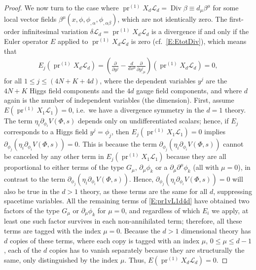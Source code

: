 \documentclass[a4paper,hidelinks, 12pt]{article}
\numberwithin{equation}{section}
\theoremstyle{plain}
\newcommand{\mc}{\mathcal}
\newcommand{\on}{\operatorname}
\begin{document}
\begin{proof}
We now turn to the case where $\on{pr}^{(1)}X_d\mc{L}_d=\on{Div} \beta \equiv d_\mu \beta^\mu$ for some local vector fields $\beta^\mu(x,\phi,\phi_{,\alpha},\phi_{,\alpha\beta})$, which are not identically zero. 
The first-order infinitesimal variation $\delta \mc{L}_d=\on{pr}^{(1)}X_d\mc{L}_d$ is a divergence if and only if the Euler operator $E$ applied to $\on{pr}^{(1)}X_d\mc{L}_d$ is zero (cf.~\eqref{E:EtotDiv}),
which means that
\begin{align}
	E_j(\on{pr}^{(1)}X_d\mc{L}_d)=(\frac{\partial}{\partial y^j}-\frac{d}{dx^\mu}\frac{\partial}{\partial y^j_{,\mu}})(\on{pr}^{(1)}X_d\mc{L}_d)=0,
\end{align}
for all $1\leq j \leq (4N+K+4d)$, where the dependent variables $y^j$
are the $4N+K$ Higgs field components and the $4d$ gauge field components, and where $d$ again is the number of independent variables (the dimension).
First, assume $E(\on{pr}^{(1)}X_1\mc{L}_1)=0$, i.e.~we have a divergence symmetry in the $d=1$ theory.
The term $\eta_i {\partial_{\phi_i} V(\Phi,s)}{}$
depends only on undifferentiated scalars; hence, 
if $E_j$ corresponds to a Higgs field $y^j=\phi_j$, then 
$E_j(\on{pr}^{(1)}X_1\mc{L}_1)=0$ implies $\partial_{\phi_j}(\eta_i \partial_{\phi_i} V(\Phi,s))=0$. This is because the term $\partial_{\phi_j}(\eta_i \partial_{\phi_i} V(\Phi,s))$ cannot be canceled by any other term in $E_j(\on{pr}^{(1)}X_1\mc{L}_1)$
because they are all proportional to either
terms of the type $G_\mu$, $\partial_\mu \phi_k$ or a $\partial_\mu\partial^\mu \phi_k$
(all with $\mu=0$), in contrast to the term $\partial_{\phi_j}(\eta_i \partial_{\phi_i} V(\Phi,s))$.  
Hence, $\partial_{\phi_j}(\eta_i \partial_{\phi_i} V(\Phi,s))=0$ will also be true in the $d>1$ theory, as these terms are the same for all $d$, suppressing spacetime variables. All the remaining terms of \eqref{E:pr1vL1d4d} have obtained two factors of the type
$G_\mu$ or $\partial_\mu \phi_k$ for $\mu=0$, and regardless of which $E_i$
we apply, at least one such factor survives in each non-annihilated term; therefore, all these terms are tagged with the index $\mu=0$. Because the $d>1$ dimensional theory 
has $d$ copies of these terms, where each copy is tagged with an index $\mu$, $0\leq \mu \leq d-1$, each of the $d$ copies has to vanish separately because they are structurally the same, only distinguished by the index $\mu$. Thus, $E(\on{pr}^{(1)}X_d\mc{L}_d)=0$.


\end{proof}
\end{document}

